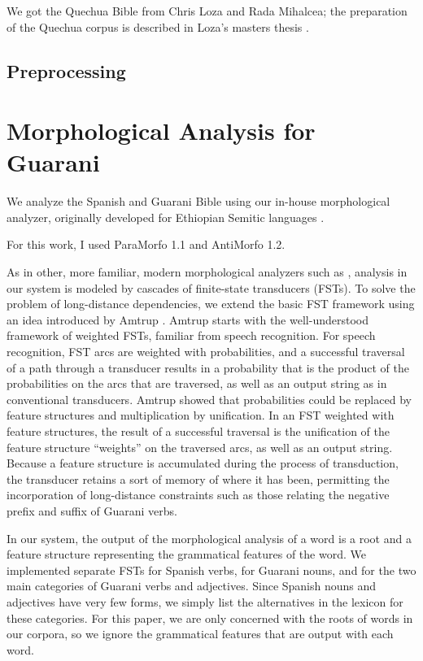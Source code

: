 We got the Quechua Bible from Chris Loza and Rada Mihalcea; the preparation
of the Quechua corpus is described in Loza's masters thesis \cite{chrisloza}.

\subsection{Preprocessing}

\section{Morphological Analysis for Guarani}
\label{sec:guaranima}
We analyze the Spanish and Guarani Bible using our in-house morphological
analyzer, originally developed for Ethiopian Semitic languages 
\cite{gasser:eacl09}.

For this work, I used ParaMorfo 1.1 and AntiMorfo 1.2.

As in other, more familiar, modern
morphological analyzers such as \cite{beesley+karttunen}, analysis in our
system is modeled by cascades of finite-state transducers (FSTs).  To solve the
problem of long-distance dependencies, we extend the basic FST framework using
an idea introduced by Amtrup \cite{amtrup:03}.  Amtrup starts with the
well-understood framework of weighted FSTs, familiar from speech recognition.
For speech recognition, FST arcs are weighted with probabilities, and a
successful traversal of a path through a transducer results in a probability
that is the product of the probabilities on the arcs that are traversed, as
well as an output string as in conventional transducers.  Amtrup showed that
probabilities could be replaced by feature structures and multiplication by
unification.  In an FST weighted with feature structures, the result of a
successful traversal is the unification of the feature structure ``weights'' on
the traversed arcs, as well as an output string.  Because a feature structure
is accumulated during the process of transduction, the transducer retains a
sort of memory of where it has been, permitting the incorporation of
long-distance constraints such as those relating the negative prefix and suffix
of Guarani verbs.

In our system, the output of the morphological analysis of a word is a root and
a feature structure representing the grammatical features of the word.  We
implemented separate FSTs for Spanish verbs, for Guarani nouns, and for the two
main categories of Guarani verbs and adjectives.  Since Spanish nouns and
adjectives have very few forms, we simply list the alternatives in the lexicon
for these categories.  For this paper, we are only concerned with the roots of
words in our corpora, so we ignore the grammatical features that are output
with each word.


